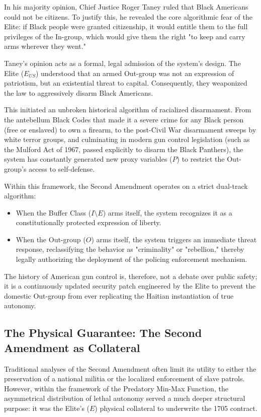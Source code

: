 \documentclass[12pt,openany]{book}
\begin{document}
In his majority opinion, Chief Justice Roger Taney ruled that Black Americans could not be citizens. To justify this, he revealed the core algorithmic fear of the Elite: if Black people were granted citizenship, it would entitle them to the full privileges of the In-group, which would give them the right "to keep and carry arms wherever they went."

Taney’s opinion acts as a formal, legal admission of the system's design. The Elite ($E_{US}$) understood that an armed Out-group was not an expression of patriotism, but an existential threat to capital. Consequently, they weaponized the law to aggressively disarm Black Americans.

This initiated an unbroken historical algorithm of racialized disarmament. From the antebellum Black Codes that made it a severe crime for any Black person (free or enslaved) to own a firearm, to the post-Civil War disarmament sweeps by white terror groups, and culminating in modern gun control legislation (such as the Mulford Act of 1967, passed explicitly to disarm the Black Panthers), the system has constantly generated new proxy variables ($P$) to restrict the Out-group's access to self-defense.

Within this framework, the Second Amendment operates on a strict dual-track algorithm:
\begin{itemize}
    \item When the Buffer Class ($I \setminus E$) arms itself, the system recognizes it as a constitutionally protected expression of liberty.
    \item When the Out-group ($O$) arms itself, the system triggers an immediate threat response, reclassifying the behavior as "criminality" or "rebellion," thereby legally authorizing the deployment of the policing enforcement mechanism.
\end{itemize}

The history of American gun control is, therefore, not a debate over public safety; it is a continuously updated security patch engineered by the Elite to prevent the domestic Out-group from ever replicating the Haitian instantiation of true autonomy.

\subsection{The Physical Guarantee: The Second Amendment as Collateral}

Traditional analyses of the Second Amendment often limit its utility to either the preservation of a national militia or the localized enforcement of slave patrols. However, within the framework of the Predatory Min-Max Function, the asymmetrical distribution of lethal autonomy served a much deeper structural purpose: it was the Elite's ($E$) physical collateral to underwrite the 1705 contract.
\end{document}
